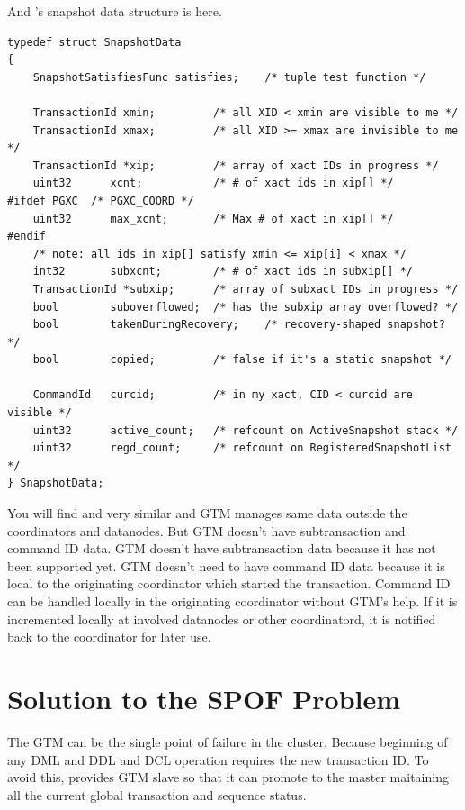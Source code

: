   And \PG's snapshot data structure is here.
  
  \begin{lstlisting}
typedef struct SnapshotData
{
	SnapshotSatisfiesFunc satisfies;	/* tuple test function */

	TransactionId xmin;			/* all XID < xmin are visible to me */
	TransactionId xmax;			/* all XID >= xmax are invisible to me */
	TransactionId *xip;			/* array of xact IDs in progress */
	uint32		xcnt;			/* # of xact ids in xip[] */
#ifdef PGXC  /* PGXC_COORD */
	uint32		max_xcnt;		/* Max # of xact in xip[] */
#endif
	/* note: all ids in xip[] satisfy xmin <= xip[i] < xmax */
	int32		subxcnt;		/* # of xact ids in subxip[] */
	TransactionId *subxip;		/* array of subxact IDs in progress */
	bool		suboverflowed;	/* has the subxip array overflowed? */
	bool		takenDuringRecovery;	/* recovery-shaped snapshot? */
	bool		copied;			/* false if it's a static snapshot */

	CommandId	curcid;			/* in my xact, CID < curcid are visible */
	uint32		active_count;	/* refcount on ActiveSnapshot stack */
	uint32		regd_count;		/* refcount on RegisteredSnapshotList */
} SnapshotData;
  \end{lstlisting}
  
  You will find  and  very similar and
  GTM manages same data outside the coordinators and datanodes.
  But GTM doesn't have subtransaction and command ID data.
  GTM doesn't have subtransaction data because it has not been supported yet.
  GTM doesn't need to have command ID data because it is local to the originating coordinator
  which started the transaction.
  Command ID can be handled locally in the originating coordinator without GTM's help.
  If it is incremented locally at involved datanodes or other coordinatord, it is notified
  back to the coordinator for later use.



\section{\label{sec:gtmsby}Solution to the SPOF Problem}

  The GTM can be the single point of failure in the cluster.
  Because beginning of any DML and DDL and DCL operation requires the new transaction ID.
  To avoid this, \XC{} provides GTM slave so that it can promote to the master maitaining
  all the current global transaction and sequence status.
  

